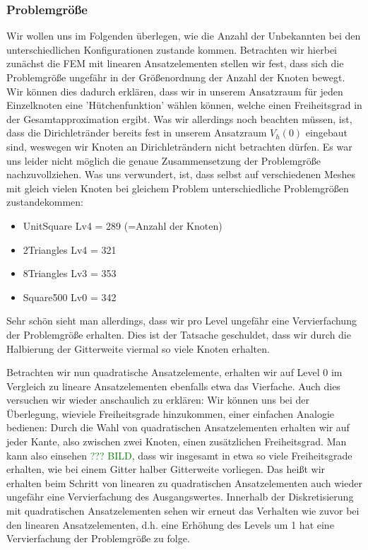 \subsubsection*{Problemgröße}
Wir wollen uns im Folgenden überlegen, wie die Anzahl der Unbekannten bei den unterschiedlichen Konfigurationen zustande kommen. 
Betrachten wir hierbei zunächst die FEM mit linearen Ansatzelementen stellen wir fest, dass sich die Problemgröße ungefähr in der Größenordnung der Anzahl der Knoten bewegt.
Wir können dies dadurch erklären, dass wir in unserem Ansatzraum für jeden Einzelknoten eine 'Hütchenfunktion' wählen können, welche einen Freiheitsgrad in der Gesamtapproximation ergibt.
Was wir allerdings noch beachten müssen, ist, dass die Dirichletränder bereits fest in unserem Ansatzraum $V_h(0)$ eingebaut sind, weswegen wir Knoten an Dirichleträndern nicht betrachten dürfen.
Es war uns leider nicht möglich die genaue Zusammensetzung der Problemgröße nachzuvollziehen. Was uns verwundert, ist, dass selbst auf verschiedenen Meshes mit gleich vielen Knoten bei gleichem Problem unterschiedliche Problemgrößen zustandekommen:
\begin{itemize}
  \item UnitSquare Lv4 = 289 (=Anzahl der Knoten)
  \item 2Triangles Lv4 = 321
  \item 8Triangles Lv3 = 353
  \item Square500  Lv0 = 342
\end{itemize} 
Sehr schön sieht man allerdings, dass wir pro Level ungefähr eine Vervierfachung der Problemgröße erhalten. Dies ist der Tatsache geschuldet, dass wir durch die Halbierung der Gitterweite viermal so viele Knoten erhalten.

Betrachten wir nun quadratische Ansatzelemente, erhalten wir auf Level 0 im Vergleich zu lineare Ansatzelementen ebenfalls etwa das Vierfache. Auch dies versuchen wir wieder anschaulich zu erklären: 
Wir können uns bei der Überlegung, wieviele Freiheitsgrade hinzukommen, einer einfachen Analogie bedienen: 
Durch die Wahl von quadratischen Ansatzelementen erhalten wir auf jeder Kante, also zwischen zwei Knoten, einen zusätzlichen Freiheitsgrad. Man kann also einsehen \textcolor{green}{??? BILD}, dass wir insgesamt in etwa so viele Freiheitsgrade erhalten, wie bei einem Gitter halber Gitterweite vorliegen. Das heißt wir erhalten beim Schritt von linearen zu quadratischen Ansatzelementen auch wieder ungefähr eine Vervierfachung des Ausgangswertes. Innerhalb der Diskretisierung mit quadratischen Ansatzelementen sehen wir erneut das Verhalten wie zuvor bei den linearen Ansatzelementen, d.h. eine Erhöhung des Levels um 1 hat eine Vervierfachung der Problemgröße zu folge.

